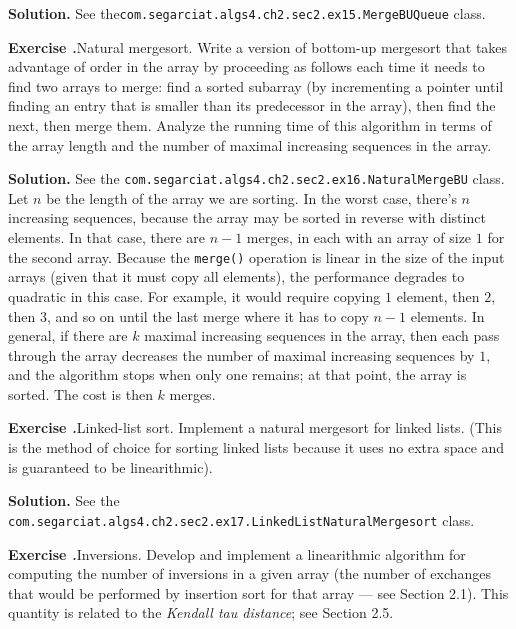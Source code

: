 \documentclass[12pt, a4paper]{article}
\newenvironment{ex}[2][Exercise]
{\par\medskip\noindent \textbf{#1 #2.}}
{\medskip}
\newenvironment{sol}[1][Solution]
{\par\medskip\noindent \textbf{#1.} }
{\medskip}
\begin{document}
	\begin{sol}
		See the\texttt{com.segarciat.algs4.ch2.sec2.ex15.MergeBUQueue} class.
	\end{sol}
	\begin{ex}{16}
		\emph{Natural mergesort}. Write a version of bottom-up mergesort that takes advantage
		of order in the array by proceeding as follows each time it needs to find
		two arrays to merge: find a sorted subarray (by incrementing a pointer until
		finding an entry that is smaller than its predecessor in the array), then find
		the next, then merge them. Analyze the running time of this algorithm in terms
		of the array length and the number of maximal increasing sequences in the array.
	\end{ex}
	\begin{sol}
		See the \texttt{com.segarciat.algs4.ch2.sec2.ex16.NaturalMergeBU} class.
		Let $n$ be the length of the array we are sorting. In the worst case,
		there's $n$ increasing sequences, because the array may be sorted in
		reverse with distinct elements. In that case, there are $n-1$ merges,
		in each with an array of size $1$ for the second array.
		Because the \texttt{merge()} operation is linear in the size of the
		input arrays (given that it must copy all elements), the performance
		degrades to quadratic in this case. For example, it would require copying
		$1$ element, then $2$, then $3$, and so on until the last merge where
		it has to copy $n-1$ elements. In general, if there are $k$ maximal increasing
		sequences in the array, then each pass through the array decreases the number
		of maximal increasing sequences by $1$, and the algorithm stops when only
		one remains; at that point, the array is sorted. The cost is then $k$ merges.
	\end{sol}
	\begin{ex}{17}
		\emph{Linked-list sort}. Implement a natural mergesort for linked lists. (This is the
		method of choice for sorting linked lists because it uses no extra space and
		is guaranteed to be linearithmic).
	\end{ex}
	\begin{sol}
		See the \texttt{com.segarciat.algs4.ch2.sec2.ex17.LinkedListNaturalMergesort} class.
	\end{sol}
	\begin{ex}{19}
		\emph{Inversions}. Develop and implement a linearithmic algorithm for computing
		the number of inversions in a given array (the number of exchanges that
		would be performed by insertion sort for that array --- see Section 2.1).
		This quantity is related to the \emph{Kendall tau distance}; see Section 2.5.
	\end{ex}
\end{document}
